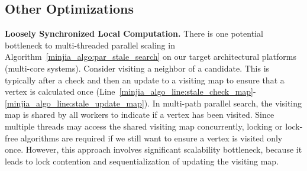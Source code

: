 %

\subsection{Other Optimizations}

\noindent\textbf{Loosely Synchronized Local Computation.}
There is one potential bottleneck to multi-threaded parallel scaling in Algorithm~\ref{minjia_algo:par_stale_search} on our target architectural platforms (multi-core systems). 
Consider visiting a neighbor of a candidate. This is typically after a check and then an update to a visiting map to ensure that a vertex is calculated once (Line~\ref{minjia_algo_line:stale_check_map}-\ref{minjia_algo_line:stale_update_map}).
In multi-path parallel search, the visiting map is shared by all workers to indicate if a vertex has been visited.
Since multiple threads may access the shared visiting map concurrently, locking or lock-free algorithms are required if we still want to ensure a vertex is visited only once. However, this approach involves significant scalability bottleneck, because it leads to lock contention and sequentialization of updating the visiting map.

